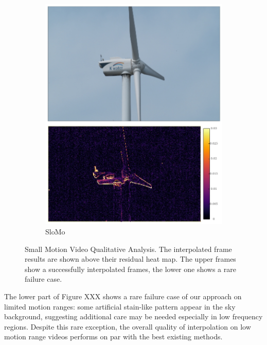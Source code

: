 \documentclass{article}
\begin{document}
\begin{figure}[h]
\begin{subfigure}{0.14\textwidth}
    \includegraphics[width=1\linewidth]{qua_imgs/TEST02_045_f0465_super.jpg}
    \caption{SloMo}
\end{subfigure}
\caption{
Small Motion Video Qualitative Analysis.
The interpolated frame results are shown above their residual heat map.
The upper frames show a successfully interpolated frames,
the lower one shows a rare failure case.}
\label{fig_small}
\end{figure}

The lower part of Figure XXX shows a rare failure case of our approach on limited motion ranges:
some artificial stain-like pattern appear in the sky background,
suggesting additional care may be needed especially in low frequency regions.
Despite this rare exception, the overall quality of interpolation
on low motion range videos performs on par with the best existing methods.
\end{document}
